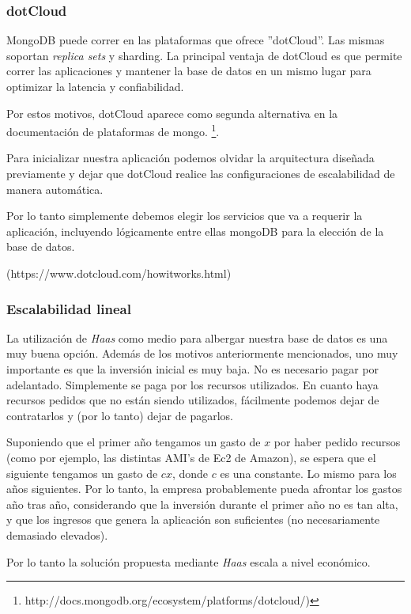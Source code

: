 \subsubsection{dotCloud}

MongoDB puede correr en las plataformas que ofrece ''dotCloud''. Las mismas soportan \emph{replica sets} y sharding.
La principal ventaja de dotCloud es que permite correr las aplicaciones y mantener la base de datos en un mismo lugar
para optimizar la latencia y confiabilidad.

Por estos motivos, dotCloud aparece como segunda alternativa en la documentación de plataformas de mongo.
\footnote{http://docs.mongodb.org/ecosystem/platforms/dotcloud/)}.

Para inicializar nuestra aplicación podemos olvidar la arquitectura diseñada previamente y dejar que dotCloud realice
las configuraciones de escalabilidad de manera automática. 

Por lo tanto simplemente debemos elegir los servicios que va a requerir la aplicación, incluyendo 
lógicamente entre ellas mongoDB para la elección de la base de datos.

(https://www.dotcloud.com/howitworks.html)


\subsubsection{Escalabilidad lineal}

La utilización de \emph{Haas} como medio para albergar nuestra base de datos es una muy buena opción. Además de los motivos
anteriormente mencionados, uno muy importante es que la inversión inicial es muy baja. No es necesario pagar por adelantado.
Simplemente se paga por los recursos  utilizados. En cuanto haya recursos pedidos que no están siendo utilizados, fácilmente
podemos dejar de contratarlos y (por lo tanto) dejar de pagarlos.

Suponiendo que el primer a\~no tengamos un gasto de $x$ por haber pedido recursos (como por ejemplo, las distintas AMI's de
Ec2 de Amazon), se espera que el siguiente tengamos un gasto de $cx$, donde $c$ es una constante. Lo mismo para los a\~nos
siguientes. Por lo tanto, la empresa probablemente pueda afrontar los gastos a\~no tras a\~no, considerando que 
la inversión durante el primer a\~no no es tan alta, y que los ingresos que genera la aplicaci\'on son suficientes (no
necesariamente demasiado elevados).

Por lo tanto la solución propuesta mediante \emph{Haas} escala a nivel económico.

